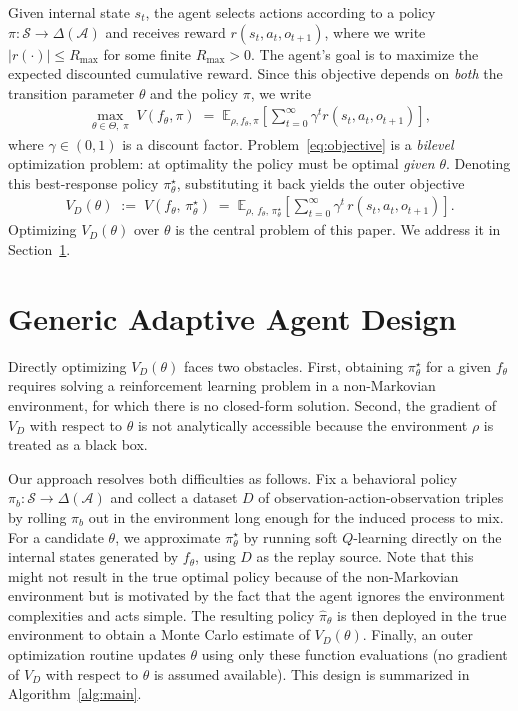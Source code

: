 \documentclass[12pt]{article}
\renewcommand{\[}{\left[}
\renewcommand{\]}{\right]}
\renewcommand{\(}{\left(}
\renewcommand{\)}{\right)}
\newcounter{l1}
\newcounter{l2}
\newcounter{l3}
\newcommand{\Rmax}{R_{\max}}
\begin{document}
Given internal state $s_t$, the agent selects actions according to a policy
$\pi : \mathcal{S} \to \Delta(\mathcal{A})$ and receives reward $r(s_t, a_t, o_{t+1})$,
where we write $|r(\cdot)| \le \Rmax$ for some finite $\Rmax > 0$.
The agent's goal is to maximize the expected discounted cumulative reward. Since this
objective depends on \emph{both} the transition parameter $\theta$ and the policy $\pi$,
we write
\begin{align}\label{eq:objective}
  \max_{\theta \in \Theta,\;\pi}\;
  V(f_\theta, \pi)
  \;=\;
  \mathbb{E}_{\rho, f_\theta, \pi}\left[\sum_{t=0}^{\infty} \gamma^t r(s_t, a_t, o_{t+1})\right],
\end{align}
where $\gamma \in (0,1)$ is a discount factor. Problem~\eqref{eq:objective} is a
\emph{bilevel} optimization problem: at optimality the policy must be optimal \emph{given}
$\theta$. Denoting this best-response policy $\pi^\star_\theta$, substituting it back
yields the outer objective
\begin{align}\label{eq:outer_obj}
  V_D(\theta)
  \;:=\;
  V\!\left(f_\theta,\, \pi^\star_\theta\right)
  \;=\;
  \mathbb{E}_{\rho,\,f_\theta,\,\pi^\star_\theta}\!
  \left[\sum_{t=0}^{\infty}\gamma^t\, r(s_t, a_t, o_{t+1})\right].
\end{align}
Optimizing $V_D(\theta)$ over $\theta$ is the central problem of this paper. We address
it in Section~\ref{sec:algorithm}.

\section{Generic Adaptive Agent Design}
\label{sec:algorithm}

Directly optimizing $V_D(\theta)$ faces two obstacles. First, obtaining
$\pi^\star_\theta$ for a given $f_\theta$ requires solving a reinforcement learning
problem in a non-Markovian environment, for which there is no closed-form solution.
Second, the gradient of $V_D$ with respect to $\theta$ is not analytically accessible
because the environment $\rho$ is treated as a black box.

Our approach resolves both difficulties as follows. Fix a behavioral policy
$\pi_b : \mathcal{S} \to \Delta(\mathcal{A})$ and collect a dataset $D$ of
observation-action-observation triples by rolling $\pi_b$ out in the environment long
enough for the induced process to mix. For a candidate $\theta$, we approximate
$\pi^\star_\theta$ by running soft $Q$-learning directly on the internal states generated
by $f_\theta$, using $D$ as the replay source. Note that this might not result in the true optimal policy because of the non-Markovian environment but is motivated by the fact that the agent ignores the environment complexities and acts simple. The resulting policy $\widehat{\pi}_\theta$
is then deployed in the true environment to obtain a Monte Carlo estimate of
$V_D(\theta)$. Finally, an outer optimization routine updates $\theta$ using only these
function evaluations (no gradient of $V_D$ with respect to $\theta$ is assumed available). This
design is summarized in Algorithm~\ref{alg:main}.
\end{document}

